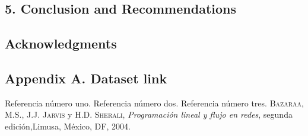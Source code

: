 \documentclass[
  letterpaper,
  DIV=11,
  numbers=noendperiod]{scrartcl}
\begin{document}
\subsection{5. Conclusion and
Recommendations}\label{conclusion-and-recommendations}

\subsection{Acknowledgments}\label{acknowledgments}

\subsection{Appendix A. Dataset link}\label{appendix-a.-dataset-link}

\newpage

\begin{thebibliography}{01}
 Referencia n\'umero uno.
 Referencia n\'umero dos.
 Referencia n\'umero tres.
 \textsc{Bazaraa, M.S., J.J. Jarvis} y \textsc{H.D. Sherali},
\textit{Programaci\'on lineal y flujo en redes}, segunda edici\'on,Limusa, M\'exico, DF, 2004.
\end{thebibliography}
\end{document}
